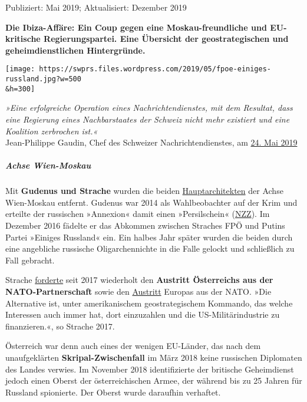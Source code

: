 Publiziert: Mai 2019; Aktualisiert: Dezember 2019

\textbf{Die Ibiza-Affäre: Ein Coup gegen eine Moskau-freundliche und
EU-kritische Regierungspartei. Eine Übersicht der geostrategischen und
geheimdienstlichen Hintergründe.}

\texttt{[image: https://swprs.files.wordpress.com/2019/05/fpoe-einiges-russland.jpg?w=500\\\&h=300]}

\emph{»Eine erfolgreiche Operation eines Nachrichten­dienstes, mit dem
Resultat, dass eine Regierung eines Nachbar­staates der Schweiz nicht
mehr existiert und eine Koalition zerbrochen ist.«}\\
Jean-Philippe Gaudin, Chef des Schweizer Nachrichtendienstes, am
\href{https://www.nzz.ch/schweiz/das-sind-die-neun-groessten-gefahren-fuer-die-schweiz-ld.1483571}{24.
Mai 2019}

\hypertarget{achse-wien-moskau}{%
\subparagraph{\texorpdfstring{\textbf{Achse
Wien-Moskau}}{Achse Wien-Moskau}}\label{achse-wien-moskau}}

Mit \textbf{Gudenus und Strache} wurden die beiden
\href{https://diepresse.com/home/innenpolitik/5136136/FPOe-schliesst-FuenfJahresVertrag-mit-KremlPartei}{Hauptarchitekten}
der Achse Wien-Moskau entfernt. Gudenus war 2014 als Wahlbeobachter auf
der Krim und erteilte der russischen »Annexion« damit einen
»Persilschein«
(\href{https://www.nzz.ch/international/die-meistgenannten-figuren-in-oesterreichs-drama-um-straches-ibizagate-sind-zwei-politiker-im-rausch-zwei-phantome-und-ein-politisch-versierter-unternehmer-ld.1482831}{NZZ}).
Im Dezember 2016 fädelte er das Abkommen zwischen Straches FPÖ und
Putins Partei »Einiges Russland« ein. Ein halbes Jahr später wurden die
beiden durch eine angebliche russische Oligarchennichte in die Falle
gelockt und schließlich zu Fall gebracht.

Strache
\href{https://kurier.at/politik/inland/fpoe-chef-heinz-christian-strache-fordert-einschraenkung-der-menschenrechte-zur-terrorbekaempfung-und-will-aus-dem-nato-partnerschaftsprogramm-aussteigen/268.854.488}{forderte}
seit 2017 wiederholt den \textbf{Austritt Österreichs aus der
NATO-Partnerschaft} sowie den
\href{https://derstandard.at/2000053241970/OeVP-begruesst-Straches-Kurswechsel-zu-einer-EU-Armee}{Austritt}
Europas aus der NATO. »Die Alternative ist, unter amerikanischem
geostra­te­gischem Kommando, das welche Interessen auch immer hat, dort
einzuzahlen und die US-Militärindustrie zu finanzieren.«, so Strache
2017.

Österreich war denn auch eines der wenigen EU-Länder, das nach dem
unaufgeklärten \textbf{Skripal-Zwischenfall} im März 2018 keine
russischen Diplomaten des Landes verwies. Im November 2018
identifizierte der britische Geheimdienst jedoch einen Oberst der
österreichischen Armee, der während bis zu 25 Jahren für Russland
spionierte. Der Oberst wurde daraufhin verhaftet.


